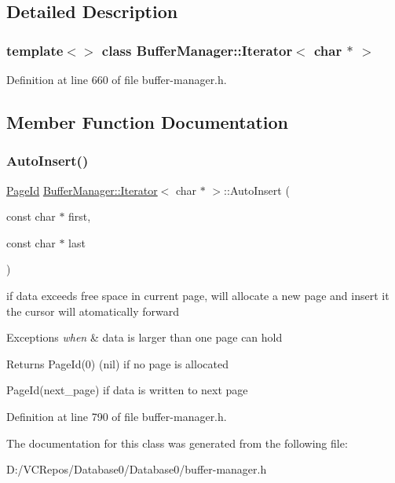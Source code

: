 \subsection{Detailed Description}
\subsubsection*{template$<$$>$\newline
class Buffer\+Manager\+::\+Iterator$<$ char $\ast$ $>$}



Definition at line 660 of file buffer-\/manager.\+h.



\subsection{Member Function Documentation}
\mbox{\label{class_buffer_manager_1_1_iterator_3_01char_01_5_01_4_a21992fa80761bab5fa8a32f000f2366a}} 
\subsubsection{\texorpdfstring{AutoInsert()}{AutoInsert()}}
{\footnotesize\ttfamily \mbox{\hyperlink{struct_generic_i_o_id}{Page\+Id}} \mbox{\hyperlink{class_buffer_manager_1_1_iterator}{Buffer\+Manager\+::\+Iterator}}$<$ char $\ast$ $>$\+::Auto\+Insert (\begin{DoxyParamCaption}\item[{const char $\ast$}]{first,  }\item[{const char $\ast$}]{last }\end{DoxyParamCaption})\hspace{0.3cm}{\ttfamily [inline]}}

if data exceeds free space in current page, will allocate a new page and insert it the cursor will atomatically forward 
\begin{DoxyExceptions}{Exceptions}
{\em when} & data is larger than one page can hold \\
\hline
\end{DoxyExceptions}
\begin{DoxyReturn}{Returns}
{\ttfamily Page\+Id(0)} (nil) if no page is allocated 

{\ttfamily Page\+Id(next\+\_\+page)} if data is written to next page 
\end{DoxyReturn}


Definition at line 790 of file buffer-\/manager.\+h.



The documentation for this class was generated from the following file\+:\begin{DoxyCompactItemize}
\item 
D\+:/\+V\+C\+Repos/\+Database0/\+Database0/buffer-\/manager.\+h\end{DoxyCompactItemize}
